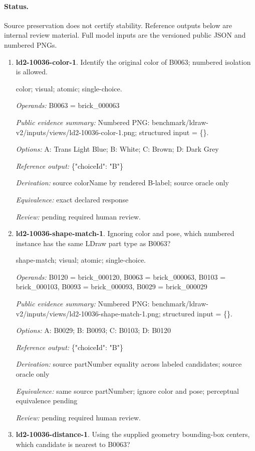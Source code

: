 \paragraph{Status.}Source preservation does not certify stability. Reference outputs below are internal review material. Full model inputs are the versioned public JSON and numbered PNGs.
\begin{enumerate}
\item \textbf{ld2-10036-color-1}. Identify the original color of B0063; numbered isolation is allowed.
\par{\small color; visual; atomic; single-choice.\par\textit{Operands:} B0063 = brick\_000063\par\textit{Public evidence summary:} Numbered PNG: benchmark/ldraw-v2/inputs/views/ld2-10036-color-1.png; structured input = \{\}.\par\textit{Options:} A: Trans Light Blue; B: White; C: Brown; D: Dark Grey\par\textit{Reference output:} \{"choiceId": "B"\}\par\textit{Derivation:} source colorName by rendered B-label; source oracle only\par\textit{Equivalence:} exact declared response\par\textit{Review:} pending required human review.}
\item \textbf{ld2-10036-shape-match-1}. Ignoring color and pose, which numbered instance has the same LDraw part type as B0063?
\par{\small shape-match; visual; atomic; single-choice.\par\textit{Operands:} B0120 = brick\_000120, B0063 = brick\_000063, B0103 = brick\_000103, B0093 = brick\_000093, B0029 = brick\_000029\par\textit{Public evidence summary:} Numbered PNG: benchmark/ldraw-v2/inputs/views/ld2-10036-shape-match-1.png; structured input = \{\}.\par\textit{Options:} A: B0029; B: B0093; C: B0103; D: B0120\par\textit{Reference output:} \{"choiceId": "B"\}\par\textit{Derivation:} source partNumber equality across labeled candidates; source oracle only\par\textit{Equivalence:} same source partNumber; ignore color and pose; perceptual equivalence pending\par\textit{Review:} pending required human review.}
\item \textbf{ld2-10036-distance-1}. Using the supplied geometry bounding-box centers, which candidate is nearest to B0063?

\end{enumerate}
